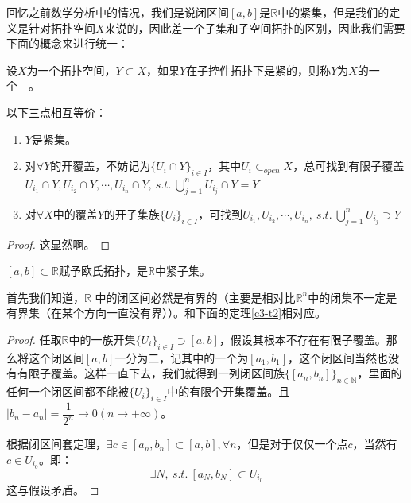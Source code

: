 \documentclass[lang=cn,10pt,device=pad]{elegantbook}
\newcommand{\cusong}{\CJKfamily{cusong}}%
\newcommand{\gn}[1]{~\textcolor{mygrn}{\cusong{#1}}~}
\newcommand{\st}{~s.t.~}
\newcommand{\dabing}{\displaystyle\bigcup}
\newcommand{\dkh}[1]{\{#1\}}
\begin{document}
回忆之前数学分析中的情况，我们是说闭区间$[a,b]$是$\mathbb{R}$中的紧集，但是我们的定义是针对拓扑空间$X$来说的，因此差一个子集和子空间拓扑的区别，因此我们需要下面的概念来进行统一：


\begin{definition}[紧子集]
	设$X$为一个拓扑空间，$Y\subset X$，如果$Y$在子控件拓扑下是紧的，则称$Y$为$X$的一个\gn{紧子集}。
\end{definition}
\begin{note}
以下三点相互等价：
\begin{enumerate}
	\item $Y$是紧集。
	\item 对$\forall Y$的开覆盖，不妨记为$\dkh{U_{i}\cap Y}_{i\in I}$，其中$U_{i}\subset_{open}X$，总可找到有限子覆盖$U_{i_{1}}\cap Y,U_{i_{2}}\cap Y,\cdots,U_{i_{n}}\cap Y, \st  \dabing_{j=1}^{n}U_{i_{j}}\cap Y = Y$
	\item 对$\forall X$中的覆盖$Y$的开子集族$\dkh{U_{i}}_{i\in I}$，可找到$U_{i_{1}},U_{i_{2}},\cdots,U_{i_{n}},\st \dabing_{j=1}^{n}U_{i_{j}}\supset Y$
\end{enumerate}	
\end{note}
\begin{proof}
	这显然啊。
\end{proof}
\begin{theorem}
	$[a,b]\subset \mathbb{R}$赋予欧氏拓扑，是$\mathbb{R}$中紧子集。
\end{theorem}

\begin{note}
首先我们知道，$\mathbb{R}$	中的闭区间必然是有界的（主要是相对比$\mathbb{R}^{n}$中的闭集不一定是有界集（在某个方向一直没有界））。和下面的定理\ref{c3-t2}相对应。
\end{note}

\begin{proof}
	任取$\mathbb{R}$中的一族开集$\dkh{U_{i}}_{i\in I}\supset [a,b]$，假设其根本不存在有限子覆盖。那么将这个闭区间$[a,b]$一分为二，记其中的一个为$[a_{1},b_{1}]$，这个闭区间当然也没有有限子覆盖。这样一直下去，我们就得到一列闭区间族$\dkh{[a_{n},b_{n}]}_{n\in \mathbb{N}}$，里面的任何一个闭区间都不能被$\dkh{U_{i}}_{i\in I}$中的有限个开集覆盖。且$|b_{n}-a_{n}| =\dfrac{1}{2^{n}} \to 0 (n\to +\infty)$。
	
	根据闭区间套定理，$\exists c\in [a_{n},b_{n}] \subset [a,b], \forall n$，但是对于仅仅一个点$c$，当然有$c\in U_{i_{0}}$。即：$$\exists N,\st [a_{N},b_{N}]\subset U_{i_{0}}$$这与假设矛盾。
\end{proof}
\end{document}

